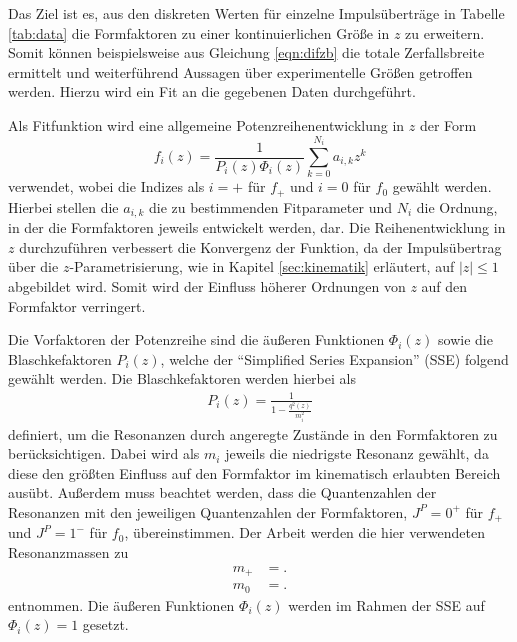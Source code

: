 Das Ziel ist es, aus den diskreten Werten für einzelne Impulsüberträge in Tabelle \ref{tab:data} die Formfaktoren zu einer kontinuierlichen Größe in $z$ zu erweitern.
Somit können beispielsweise aus Gleichung \eqref{eqn:difzb} die totale Zerfallsbreite ermittelt und weiterführend Aussagen über experimentelle Größen getroffen werden.
Hierzu wird ein Fit an die gegebenen Daten durchgeführt. 

Als Fitfunktion wird eine allgemeine Potenzreihenentwicklung in $z$ der Form
\begin{equation}
  \label{eqn:reihenentwicklung}
  f_i(z) = \frac{1}{P_i(z) \Phi_i(z)} \sum_{k=0}^{N_i} a_{i,k} z^{k}
\end{equation}
verwendet, wobei die Indizes als $i=+$ für $f_+$ und $i=0$ für $f_0$ gewählt werden.
Hierbei stellen die $a_{i,k}$ die zu bestimmenden Fitparameter und $N_i$ die Ordnung, in der die Formfaktoren jeweils entwickelt werden, dar.
Die Reihenentwicklung in $z$ durchzuführen verbessert die Konvergenz der Funktion, da der Impulsübertrag über die $z$-Parametrisierung, wie in Kapitel \ref{sec:kinematik} erläutert, auf $\lvert z \rvert \leq 1$ abgebildet wird.
Somit wird der Einfluss höherer Ordnungen von $z$ auf den Formfaktor verringert.

Die Vorfaktoren der Potenzreihe sind die äußeren Funktionen $\Phi_i(z)$ sowie die Blaschkefaktoren $P_i(z)$, welche der \enquote{Simplified Series Expansion} (SSE) \cite{PhysRevD.79.013008} folgend gewählt werden.
Die Blaschkefaktoren werden hierbei als
\begin{align*}
  P_i(z) = \frac{1}{1 - \frac{q^2(z)}{m_i^2}}
\end{align*}
definiert, um die Resonanzen durch angeregte Zustände in den Formfaktoren zu berücksichtigen.
Dabei wird als $m_i$ jeweils die niedrigste Resonanz gewählt, da diese den größten Einfluss auf den Formfaktor im kinematisch erlaubten Bereich ausübt.
Außerdem muss beachtet werden, dass die Quantenzahlen der Resonanzen mit den jeweiligen Quantenzahlen der Formfaktoren, $J^P = 0^{+}$ für $f_+$ und $J^P = 1^-$ für $f_0$, übereinstimmen.
Der Arbeit \cite{PhysRevD.94.094008} werden die hier verwendeten Resonanzmassen zu
\begin{align*}
  m_+ &= .\\
  m_0 & = .
\end{align*}
entnommen.
Die äußeren Funktionen $\Phi_i(z)$ werden im Rahmen der SSE auf $\Phi_i(z) = \num{1}$ gesetzt.

